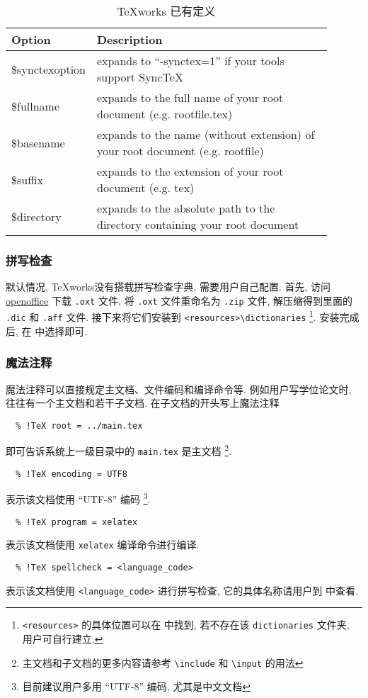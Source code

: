 \begin{table}
  \centering
  \caption{\TeX works 已有定义}\label{tab:variables}
  \begin{tabular}{p{0.15\linewidth}p{0.75\linewidth}}
    \toprule
    Option & Description\\
    \midrule
    \$synctexoption & expands to ``-synctex=1'' if your tools support SyncTeX\\
    \$fullname & expands to the full name of your root document (e.g. rootfile.tex)\\
    \$basename & expands to the name (without extension) of your root document (e.g. rootfile)\\
    \$suffix & expands to the extension of your root document (e.g. tex)\\
    \$directory & expands to the absolute path to the directory containing your root document\\
    \bottomrule
  \end{tabular}
\end{table}

\subsubsection{拼写检查}

默认情况, \TeX works没有搭载拼写检查字典, 需要用户自己配置. 
首先, 访问
\href{https://extensions.openoffice.org/dictionary}{openoffice}
下载 \texttt{.oxt} 文件.
将 \texttt{.oxt} 文件重命名为 \texttt{.zip} 文件,
解压缩得到里面的 \texttt{.dic} 和 \texttt{.aff} 文件.
接下来将它们安装到
\texttt{<resources>\textbackslash dictionaries}%
\footnote{\texttt{<resources>} 的具体位置可以在
 中找到,
若不存在该 \texttt{dictionaries} 文件夹,
用户可自行建立.}. 
安装完成后, 在  中选择即可. 

\subsubsection{魔法注释}

魔法注释可以直接规定主文档、文件编码和编译命令等. 
例如用户写学位论文时, 往往有一个主文档和若干子文档. 
在子文档的开头写上魔法注释
\begin{lstlisting}
  % !TeX root = ../main.tex
\end{lstlisting}
即可告诉系统上一级目录中的 \texttt{main.tex} 是主文档%
\footnote{主文档和子文档的更多内容请参考 \texttt{\textbackslash include}
和 \texttt{\textbackslash input} 的用法}. 
\begin{lstlisting}
  % !TeX encoding = UTF8
\end{lstlisting}
表示该文档使用 ``UTF-8'' 编码%
\footnote{目前建议用户多用 ``UTF-8'' 编码, 尤其是中文文档}. 
\begin{lstlisting}
  % !TeX program = xelatex
\end{lstlisting}
表示该文档使用 \texttt{xelatex} 编译命令进行编译. 
\begin{lstlisting}
  % !TeX spellcheck = <language_code>
\end{lstlisting}
表示该文档使用 \texttt{<language\_code>} 进行拼写检查,
它的具体名称请用户到  中查看. 

